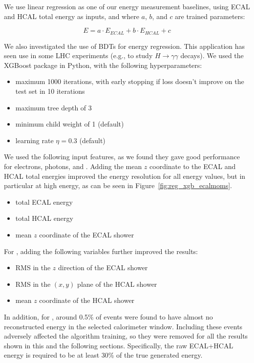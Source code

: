 We use linear regression as one of our energy measurement baselines, using ECAL and HCAL total energy as inputs, and where $a$, $b$, and $c$ are trained parameters:

\begin{equation}
E = a \cdot E_{ECAL} + b \cdot E_{HCAL} + c
\label{eq:linreg}
\end{equation}

We also investigated the use of BDTs for energy regression. This application has seen use in some LHC experiments (e.g., to study $H \rightarrow \gamma\gamma$ decays).  We used the XGBoost package in Python, with the following hyperparameters:

\begin{itemize}
\item maximum 1000 iterations, with early stopping if loss doesn't improve on the test set in 10 iterations
\item maximum tree depth of 3
\item minimum child weight of 1 (default)
\item learning rate $\eta = 0.3$ (default)
\end{itemize}

We used the following input features, as we found they gave good performance for electrons, photons, and \pizero. Adding the mean $z$ coordinate to the ECAL and HCAL total energies improved the energy resolution for all energy values, but in particular at high energy, as can be seen in Figure~\ref{fig:reg_xgb_ecalmoms}.

\begin{itemize}
\item total ECAL energy
\item total HCAL energy
\item mean $z$ coordinate of the ECAL shower
\end{itemize}

For \chpi, adding the following variables further improved the results:

\begin{itemize}
\item RMS in the $z$ direction of the ECAL shower
\item RMS in the $(x,y)$ plane of the HCAL shower
\item mean $z$ coordinate of the HCAL shower
\end{itemize}

In addition, for \chpi, around 0.5\% of events were found to have almost no reconstructed energy in the selected calorimeter window.  Including these events adversely affected the algorithm training, so they were removed for all the results shown in this and the following sections. Specifically, the raw ECAL+HCAL energy is required to be at least 30\% of the true generated energy.

